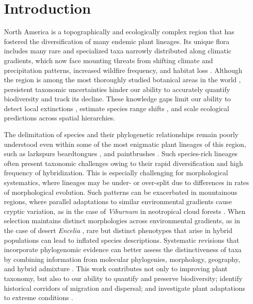 \documentclass[11pt]{article}
\begin{document}
\section*{Introduction}
North America is a topographically and ecologically complex region that has fostered the 
diversification of many endemic plant lineages. Its unique flora includes many rare and
specialized taxa narrowly distributed along climatic gradients, which now face mounting
threats from shifting climate and precipitation patterns, increased wildfire frequency, and habitat loss
\citep{kannenberg_rapid_2021,overpeck_climate_2020}.
% 
Although the region is among the most thoroughly studied botanical areas in the world
\citep{hickman1993jepson}, persistent taxonomic uncertainties hinder our ability to
accurately quantify biodiversity and track its decline. 
These knowledge gaps limit our ability to detect local extinctions \citep{wiens_climate-related_2016},
estimate species range shifts \citep{frei_plant_2010}, 
and scale ecological predictions across spatial hierarchies. 


The delimitation of species and their phylogenetic relationships remain poorly
understood even within some of the most enigmatic plant lineages of this region, 
such as larkspurs \citep[\emph{Delphinium};][]{jabbour_phylogeny_2012, xiang_recircumscription_2017} 
beardtongues \citep[\emph{Penstemon};][]{wessinger_multiplexed_2016,wolfe_phylogenetics_2021},
and paintbrushes \citep[\emph{Castilleja}][]{tank_phylogenetic_2009,jacobs_quantifying_2019}.
% 
Such species-rich lineages often present taxonomic challenges owing to their 
rapid diversification and high frequency of hybridization.
% 
This is especially challenging for morphological systematics, where lineages
may be under- or over-split due to differences in rates of morphological evolution.
% 
Such patterns can be exacerbated in mountainous regions, where parallel adaptations
to similar environmental gradients cause cryptic variation, as in the case of 
\emph{Viburnum} in neotropical cloud forests \citep{donoghue_replicated_2022}. 
% 
When selection maintains distinct morphologies across environmental gradients, 
as in the case of desert \emph{Encelia} \citep{divittorio_natural_2020}, rare but 
distinct phenotypes that arise in hybrid populations can lead to inflated species 
descriptions.
% 
Systematic revisions that incorporate phylogenomic evidence can better
assess the distinctiveness of taxa by combining information from molecular
phylogenies, morphology, geography, and hybrid admixture 
\citep{hipp_genomic_2020}.
% 
This work contributes not only to improving plant taxonomy, but also to
our ability to quantify and preserve biodiversity; identify historical 
corridors of migration and dispersal; and investigate plant adaptations
to extreme conditions \citep{anstett_2021, gross_unforeseen_2024, melton_draft_2021}. 
\end{document}
